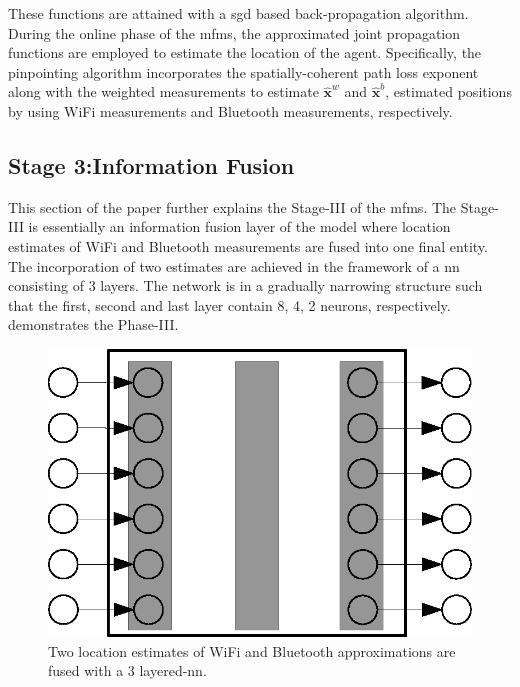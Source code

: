     These functions are attained with a \gls{sgd} based back-propagation algorithm.
    During the online phase of the \gls{mfms}, the approximated joint propagation functions are employed to estimate the location of the agent.
    Specifically, the pinpointing algorithm incorporates the spatially-coherent path loss exponent along with the weighted measurements to estimate $\bm{\hat{x}}^w$ and $\bm{\hat{x}}^b$, estimated positions by using WiFi measurements and Bluetooth measurements, respectively.



    \subsection{Stage 3:Information Fusion}
    This section of the paper further explains the Stage-III of the \gls{mfms}.
    The Stage-III is essentially an information fusion layer of the model where location estimates of WiFi and Bluetooth measurements are fused into one final entity.
    The incorporation of two estimates are achieved in the framework of a \gls{nn} consisting of 3 layers.
    The network is in a gradually narrowing structure such that the first, second and last layer contain 8, 4, 2 neurons, respectively.
     demonstrates the Phase-III\@.

    \begin{figure}[thpb]
       \centering
       \includegraphics[width=0.95\linewidth]{figures/fusion.eps}
       \caption{\label{fig:fusion}Two location estimates of WiFi and Bluetooth approximations are fused with a 3 layered-\gls{nn}.}
    \end{figure}

